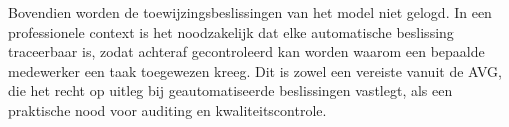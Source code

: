 Bovendien worden de toewijzingsbeslissingen van het model niet gelogd. In een professionele context is het noodzakelijk dat elke automatische beslissing traceerbaar is, zodat achteraf gecontroleerd kan worden waarom een bepaalde medewerker een taak toegewezen kreeg. Dit is zowel een vereiste vanuit de AVG, die het recht op uitleg bij geautomatiseerde beslissingen vastlegt, als een praktische nood voor auditing en kwaliteitscontrole.

